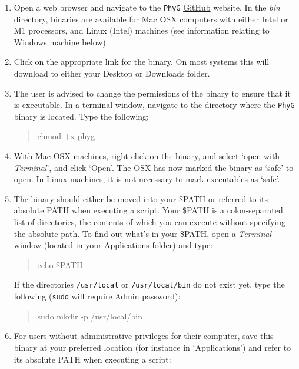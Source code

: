 \documentclass[]{article}
\newcommand{\phyg}{\texttt{PhyG} }
\begin{document}
\begin{enumerate}
\item Open a web browser and navigate to the \phyg \href{https://github.com/amnh/PhyGraph}
{GitHub} website. In the \textit{bin} directory, binaries are available for Mac OSX 
computers with either Intel or M1 processors, and Linux (Intel) machines (see information 
relating to Windows machine below).

\item Click on the appropriate link for the binary. On most systems this will 
download to either your Desktop or Downloads folder. 

\item The user is advised to change the permissions of the binary to ensure
that it is executable. In a terminal window, navigate to the directory where the \phyg
binary is located. Type the following:

	\begin{quote}
	chmod +x phyg
	\end{quote}

\item With Mac OSX machines, right click on the binary, and select `open with 
\textit{Terminal}', and click `Open'. The OSX has now marked the binary as `safe' 
to open. In Linux machines, it is not necessary to mark executables as `safe'.

\item The binary should either be moved into your \$PATH or referred to its 
absolute PATH when executing a script. Your \$PATH is a colon-separated list 
of directories, the contents of which you can execute without specifying the 
absolute path. To find out what's in your \$PATH, open a \textit{Terminal} window 
(located in your Applications folder) and type: 

	\begin{quote}
	echo \$PATH
	\end{quote}

If the directories \texttt{/usr/local} or \texttt{/usr/local/bin} do not exist yet, type the 
following (\texttt{sudo} will require Admin password): 

	\begin{quote}
	sudo mkdir -p /usr/local/bin
	\end{quote}

\item For users without administrative privileges for their computer, save
this binary at your preferred location (for instance in `Applications') and refer to its 
absolute PATH when executing a script: 


\end{enumerate}
\end{document}
